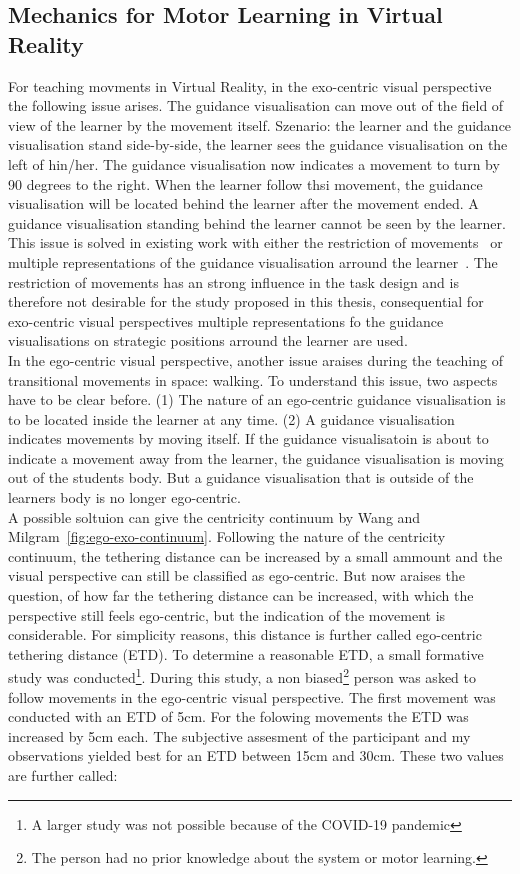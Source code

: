 \subsection{Mechanics for Motor Learning in Virtual Reality}
For teaching movments in Virtual Reality, in the exo-centric visual perspective the following issue arises. The guidance visualisation can move out of the field of view of the learner by the movement itself. Szenario: the learner and the guidance visualisation stand side-by-side, the learner sees the guidance visualisation on the left of hin/her. The guidance visualisation now indicates a movement to turn by 90 degrees to the right. When the learner follow thsi movement, the guidance visualisation will be located behind the learner after the movement ended. A guidance visualisation standing behind the learner cannot be seen by the learner.\\
This issue is solved in existing work with either the restriction of movements~\cite{freethrowsimulator,elearningma} or multiple representations of the guidance visualisation arround the learner~\cite{thaichichua,mythaichicoaches}. The restriction of movements has an strong influence in the task design and is therefore not desirable for the study proposed in this thesis, consequential for exo-centric visual perspectives multiple representations fo the guidance visualisations on strategic positions arround the learner are used.\\
In the ego-centric visual perspective, another issue araises during the teaching of transitional movements in space: walking. To understand this issue, two aspects have to be clear before. (1) The nature of an ego-centric guidance visualisation is to be located inside the learner at any time. (2) A guidance visualisation indicates movements by moving itself. If the guidance visualisatoin is about to indicate a movement away from the learner, the guidance visualisation is moving out of the students body. But a guidance visualisation that is outside of the learners body is no longer ego-centric.\\
A possible soltuion can give the centricity continuum by Wang and Milgram~\ref{fig:ego-exo-continuum}. Following the nature of the centricity continuum, the tethering distance can be increased by a small ammount and the visual perspective can still be classified as ego-centric. But now araises the question, of how far the tethering distance can be increased, with which the perspective still feels ego-centric, but the indication of the movement is considerable. For simplicity reasons, this distance is further called ego-centric tethering distance (ETD). To determine a reasonable ETD, a small formative study was conducted\footnote{A larger study was not possible because of the COVID-19 pandemic}. During this study, a non biased\footnote{The person had no prior knowledge about the system or motor learning.} person was asked to follow movements in the ego-centric visual perspective. The first movement was conducted with an ETD of 5cm. For the folowing movements the ETD was increased by 5cm each. The subjective assesment of the participant and my observations yielded best for an ETD between 15cm and 30cm. These two values are further called:
